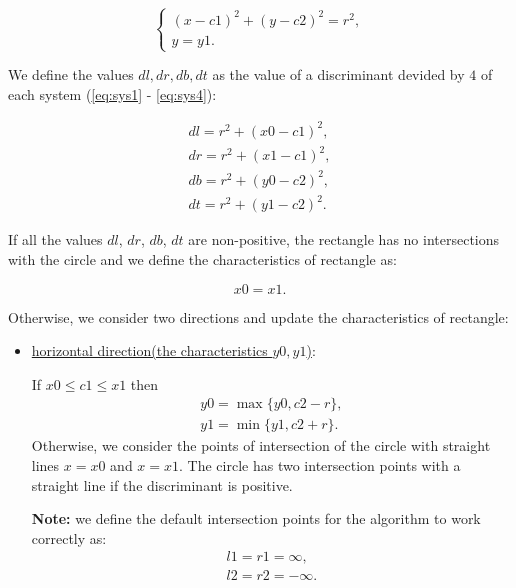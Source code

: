 \documentclass{report}
\begin{document}
\begin{itemize}
		\begin{equation}
			\begin{cases}
				(x - c1)^2 + (y - c2)^2 = r^2,\\ 
	 			y = y1.				
			\end{cases}
		\label{eq:sys4}
		\end{equation}
	
		We define the values $dl, dr, db, dt$ as the value of a discriminant devided by  $4$ of each system (\ref{eq:sys1} - \ref{eq:sys4}):
		 
		 \begin{equation}
		 	\begin{gathered}
		 		dl = r^2 + (x0 - c1)^2,\\
		 		dr = r^2 + (x1 - c1)^2,\\
		 		db = r^2 + (y0 - c2)^2,\\
		 		dt = r^2 + (y1 - c2)^2.
		 		\label{eq:diskriminant}
		 	\end{gathered}
		 \end{equation}
		
		If all the values $dl$, $dr$, $db$, $dt$  are non-positive,  the rectangle has no intersections with the circle and we define the characteristics of rectangle as: 
		
		\begin{equation}
			 x0 = x1.
			 \label{eq:empty}
		\end{equation}
	
		Otherwise, we consider two directions and update the characteristics of rectangle:
		
		\begin{itemize}
			
			\item \underline {horizontal direction(the characteristics $y0, y1$)}:
			
			If   $x0 \le c1\le x1$ then
			\begin{equation}
				\begin{gathered}
					y0 = \max\{y0, c2-r\},\\
					y1 = \min\{y1, c2+r\}.
				\end{gathered}
			\end{equation}
			Otherwise, we consider the points of intersection of the circle with straight lines $x = x0$ and $x = x1$. The circle has two intersection points with a straight line if the discriminant is positive.
			
			{\bfseries Note:} we define the default intersection points for the algorithm to work correctly as:
			\begin{equation}
				\begin{gathered}
				l1 = r1 =  \infty,\\
				l2 = r2 = -\infty.
				\label{eq:lrinf}
				\end{gathered}
			\end{equation}
		

\end{itemize}
\end{itemize}
\end{document}
